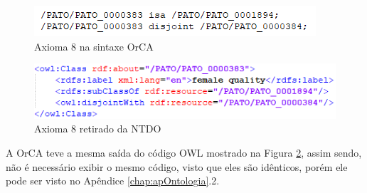 \documentclass{bcc}
\begin{document}
\begin{figure}[H]
\centering
\includegraphics[width=.7\textwidth]{Figuras/axioma8_orca.png}
\caption{Axioma 8 na sintaxe OrCA} 
\label{fig:axioma8_orca}
\end{figure}

\begin{figure}[H]
\centering
\includegraphics[width=1\textwidth]{Figuras/axioma8_o.png}
\caption{Axioma 8 retirado da NTDO} 
\label{fig:axioma8_o}
\end{figure}

A OrCA teve a mesma saída do código OWL mostrado na Figura \ref{fig:axioma8_o}, assim sendo, não é necessário exibir o mesmo código, visto que eles são idênticos, porém ele pode ser visto no Apêndice \ref{chap:apOntologia}.2.




 
\end{document}
